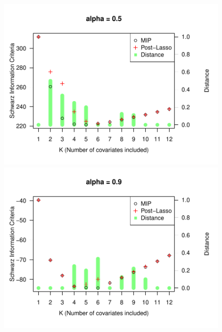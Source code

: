 \begin{figure}
\begin{minipage}[t]{0.4\linewidth}
\begin{minipage}[b]{\linewidth}
      \centering     \includegraphics[width=\textwidth]{Figuras/SIC05.pdf}
     \end{minipage}
  \end{minipage}
  \begin{minipage}[t]{0.4\linewidth}
    \centering
    \begin{minipage}[b]{\linewidth}
      \centering     \includegraphics[width=\textwidth]{Figuras/SIC09.pdf}
    \end{minipage}
     \begin{minipage}[b]{\linewidth}

\end{minipage}
\end{minipage}
\end{figure}
